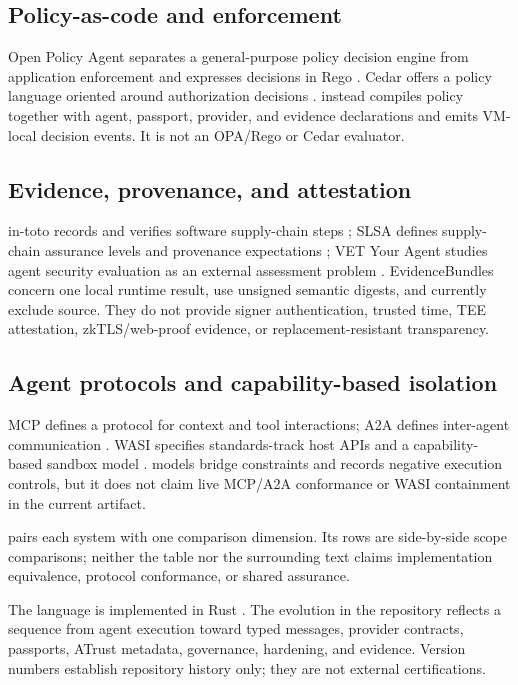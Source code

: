 \subsection{Policy-as-code and enforcement}
Open Policy Agent separates a general-purpose policy decision engine from
application enforcement and expresses decisions in Rego \citep{opa_docs}.
Cedar offers a policy language oriented around authorization decisions
\citep{cedar_policy}.  \Argorix instead compiles policy together with agent,
passport, provider, and evidence declarations and emits VM-local decision
events.  It is not an OPA/Rego or Cedar evaluator.

\subsection{Evidence, provenance, and attestation}
in-toto records and verifies software supply-chain steps
\citep{torresarias2019intoto}; SLSA defines supply-chain assurance levels and
provenance expectations \citep{slsa_spec}; VET Your Agent studies agent
security evaluation as an external assessment problem \citep{vet_your_agent}.
\Argorix EvidenceBundles concern one local runtime result, use unsigned
semantic digests, and currently exclude source.  They do not provide signer
authentication, trusted time, TEE attestation, zkTLS/web-proof evidence, or
replacement-resistant transparency.

\subsection{Agent protocols and capability-based isolation}
MCP defines a protocol for context and tool interactions; A2A defines
inter-agent communication \citep{mcp_spec_2025,a2a_spec}.  WASI specifies
standards-track host APIs and a capability-based sandbox model
\citep{wasi_intro}.  \Argorix models bridge constraints and records negative
execution controls, but it does not claim live MCP/A2A conformance or WASI
containment in the current artifact.

\begin{table}[t]
\centering
\caption{Scope of related-work comparisons. Each row is relational, not an
equivalence or conformance claim.}
\label{tab:related-work}

\end{table}

 pairs each system with one comparison dimension.  Its
rows are side-by-side scope comparisons; neither the table nor the surrounding
text claims implementation equivalence, protocol conformance, or shared
assurance.

The language is implemented in Rust \citep{rust_project}.  The evolution in
the repository reflects a sequence from agent execution toward typed messages,
provider contracts, passports, ATrust metadata, governance, hardening, and
evidence.  Version numbers establish repository history only; they are not
external certifications.
